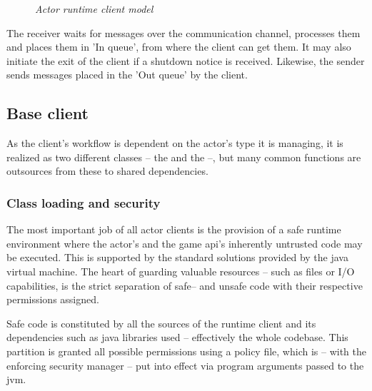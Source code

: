 \begin{figure}[h]
		\caption*{\emph{Actor runtime client model}}
	\end{figure}
	
	The receiver waits for messages over the communication channel, processes them and places them in 'In queue', from where the client can get them. It may also initiate the exit of the client if a shutdown notice is received. Likewise, the sender sends messages placed in the 'Out queue' by the client.
	
		\subsection{Base client}

			As the client's workflow is dependent on the actor's type it is managing, it is realized as two different classes -- the  and the  --, but many common functions are outsources from these to shared dependencies.

			\subsubsection*{Class loading and security}
		
			The most important job of all actor clients is the provision of a safe runtime environment where the actor's and the game api's inherently untrusted code may be executed. This is supported by the standard solutions provided by the java virtual machine. The heart of guarding valuable resources -- such as files or \mbox{I/O} capabilities, is the strict separation of safe-- and unsafe code with their respective permissions assigned.
			
			Safe code is constituted by all the sources of the runtime client and its dependencies such as java libraries used -- effectively the whole codebase. This partition is granted all possible permissions using a policy file, which is -- with the enforcing security manager -- put into effect via program arguments passed to the jvm.

